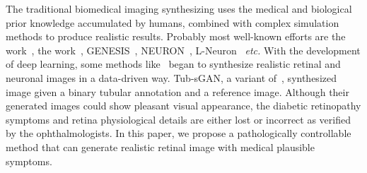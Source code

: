 \documentclass[letterpaper]{article} %
\begin{document}
	The traditional biomedical imaging synthesizing uses the medical and biological prior knowledge accumulated by humans, combined with complex simulation methods to produce realistic results. 	Probably most well-known efforts are the work~\cite{fiorini2014automatic}, the work~\cite{bonaldi2016automatic}, GENESIS~\cite{bower2015genesis}, NEURON~\cite{carnevale2006neuron}, L-Neuron~\cite{ascoli2000neuron} \textit{etc.}
	With the development of deep learning, some methods like~\cite{zhao2018synthesizing} began to synthesize realistic retinal and neuronal images in a data-driven way. Tub-sGAN, a variant of~\cite{zhao2018synthesizing}, synthesized image given a binary tubular annotation and a reference image. Although their generated images could show pleasant visual appearance, the diabetic retinopathy symptoms and retina physiological details are either lost or  incorrect as verified by the ophthalmologists. In this paper, we propose a pathologically controllable method that can generate realistic retinal image with medical plausible symptoms.
    
    
    
    
    
    
    
    
    
    
    
    
    
    
    
    
    
    
    
\end{document}

